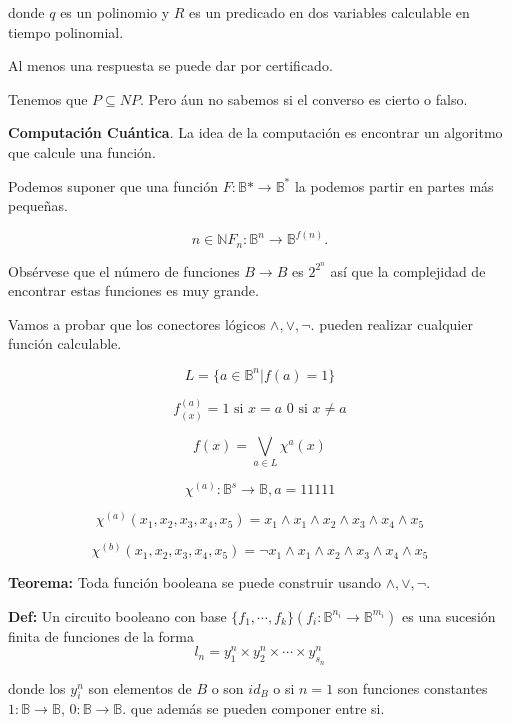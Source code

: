 \documentclass[letter,twoside,12pt]{article}
\begin{document}
donde $ q $ es un polinomio y $ R $ es un predicado en dos variables calculable en tiempo polinomial.

Al menos una respuesta se puede dar por certificado. 

Tenemos que $ P \subseteq NP $. Pero áun no sabemos si el converso es cierto o falso.

\textbf{Computación Cuántica}. La idea de la computación es encontrar un algoritmo que calcule una función.

Podemos suponer que una función $ F: \mathbb{B}* \to \mathbb{B}^*$ la podemos partir en partes más pequeñas.

\begin{equation}
n \in \mathbb{N} F_n: \mathbb{B}^n \to \mathbb{B}^{f(n)} .
\end{equation}

Obsérvese que el número de funciones $ B \to B $ es $ 2^{2^n} $ así que la complejidad de encontrar estas funciones es muy grande.

Vamos a probar que los conectores lógicos $ \wedge, \vee , \neg$. pueden realizar cualquier función calculable.

\begin{equation}
L = \{a \in \mathbb{B}^n|f(a)=1 \}
\end{equation}

\begin{equation}
f_{(x)}^{(a)}= \text {1 si } x = a \text{ 0 si } x  \not = a
\end{equation}

\begin{equation}
f(x)= \bigvee_{a \in L} \chi^{a}(x)
\end{equation}

\begin{equation}
\chi^{(a)}: \mathbb{B}^s \to \mathbb{B}, a =11111
\end{equation}

\begin{equation}
\chi^{(a)}(x_1,x_2,x_3,x_4,x_5)=x_1 \wedge x_1 \wedge x_2 \wedge x_3 \wedge x_4 \wedge x_5
\end{equation}


\begin{equation}
\chi^{(b)}(x_1,x_2,x_3,x_4,x_5)=\neg x_1 \wedge x_1 \wedge x_2 \wedge x_3 \wedge x_4 \wedge x_5
\end{equation}


\textbf{Teorema:} Toda función booleana se puede construir usando $ \wedge, \vee, \neg $.

\textbf{Def:} Un circuito booleano con base $ \{f_1,\cdots, f_k \}  (f_i: \mathbb{B}^{n_i} \to \mathbb{B}^{m_i})$ es una sucesión finita de funciones de la forma 
\begin{equation}
l_n=y_1^n \times y_2^n \times \cdots \times y_{s_n}^{n}
\end{equation}

donde los $ y_i^n $ son elementos de $ B $ o son $ id_{B} $ o si $ n=1 $ son funciones constantes $ 1: \mathbb{B} \to \mathbb{B} $, $ 0: \mathbb{B} \to \mathbb{B} $. que además se pueden componer entre si.
\end{document}
